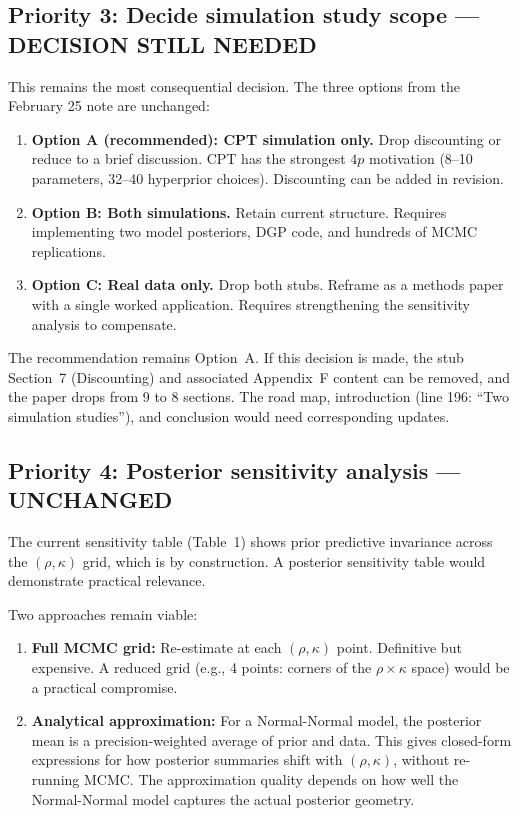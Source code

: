 \documentclass[12pt,a4paper]{article}
\begin{document}
\subsection{Priority 3: Decide simulation study scope --- DECISION STILL NEEDED}

This remains the most consequential decision. The three options from the
February 25 note are unchanged:

\begin{enumerate}[label=(\alph*)]
  \item \textbf{Option A (recommended): CPT simulation only.} Drop discounting
    or reduce to a brief discussion. CPT has the strongest $4p$ motivation
    (8--10 parameters, 32--40 hyperprior choices). Discounting can be added in
    revision.
  \item \textbf{Option B: Both simulations.} Retain current structure. Requires
    implementing two model posteriors, DGP code, and hundreds of MCMC
    replications.
  \item \textbf{Option C: Real data only.} Drop both stubs. Reframe as a
    methods paper with a single worked application. Requires strengthening the
    sensitivity analysis to compensate.
\end{enumerate}

The recommendation remains Option~A. If this decision is made, the stub
Section~7 (Discounting) and associated Appendix~F content can be removed, and
the paper drops from 9 to 8 sections. The road map, introduction (line 196:
``Two simulation studies''), and conclusion would need corresponding updates.


\subsection{Priority 4: Posterior sensitivity analysis --- UNCHANGED}

The current sensitivity table (Table~1) shows prior predictive invariance
across the $(\rho, \kappa)$ grid, which is by construction. A posterior
sensitivity table would demonstrate practical relevance.

Two approaches remain viable:

\begin{enumerate}[label=(\alph*)]
  \item \textbf{Full MCMC grid:} Re-estimate at each $(\rho, \kappa)$ point.
    Definitive but expensive. A reduced grid (e.g., 4 points: corners of the
    $\rho \times \kappa$ space) would be a practical compromise.
  \item \textbf{Analytical approximation:} For a Normal-Normal model, the
    posterior mean is a precision-weighted average of prior and data. This gives
    closed-form expressions for how posterior summaries shift with $(\rho,
    \kappa)$, without re-running MCMC. The approximation quality depends on how
    well the Normal-Normal model captures the actual posterior geometry.
\end{enumerate}
\end{document}
